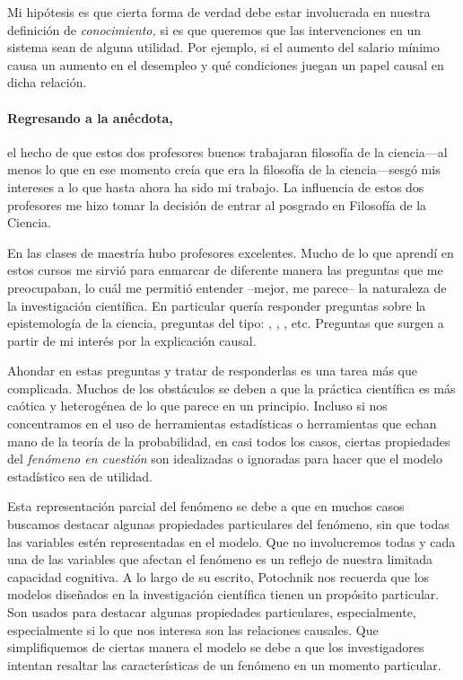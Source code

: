 Mi hipótesis es que cierta forma de verdad debe estar
involucrada en nuestra definición de \emph{conocimiento,} si
es que queremos que las intervenciones en un sistema sean de
alguna utilidad. Por ejemplo, si el aumento del salario
mínimo causa un aumento en el desempleo y qué condiciones
juegan un papel causal en dicha relación.

\paragraph{Regresando a la anécdota,} el hecho de que estos
dos profesores buenos trabajaran filosofía de la ciencia---al 
menos lo que en ese momento creía que era la filosofía de la
ciencia---sesgó mis intereses a lo que hasta ahora ha sido mi
trabajo. La influencia de estos dos profesores me hizo tomar
la decisión de entrar al posgrado en Filosofía de la Ciencia.

En las clases de maestría hubo profesores excelentes. Mucho de lo que
aprendí en estos cursos me sirvió para enmarcar de diferente manera
las preguntas que me preocupaban, lo cuál me permitió entender
--mejor, me parece-- la naturaleza de la investigación científica. En
particular quería responder preguntas sobre la epistemología de la
ciencia, preguntas del tipo: , , , etc. Preguntas que surgen a partir de mi interés
por la explicación causal.

Ahondar en estas preguntas y tratar de responderlas es una tarea más
que complicada. Muchos de los obstáculos se deben a que la práctica
científica es más caótica y heterogénea de lo que parece en un
principio. Incluso si nos concentramos en el uso de herramientas
estadísticas o herramientas que echan mano de la teoría de la
probabilidad, en casi todos los casos, ciertas propiedades del
\emph{fenómeno en cuestión} son idealizadas o ignoradas para hacer
que el modelo estadístico sea de utilidad.

Esta representación parcial del fenómeno se debe a que en muchos
casos buscamos destacar algunas propiedades particulares del
fenómeno, sin que todas las variables estén representadas en el
modelo. Que no involucremos todas y cada una de las variables que
afectan el fenómeno es un reflejo de nuestra limitada capacidad
cognitiva. A lo largo de su escrito, Potochnik nos recuerda que los
modelos diseñados en la investigación científica tienen un propósito
particular. Son usados para destacar algunas propiedades
particulares, especialmente, especialmente si lo que nos interesa son
las relaciones causales. Que simplifiquemos de ciertas manera el
modelo se debe a que los investigadores intentan resaltar las
características de un fenómeno en un momento particular.

